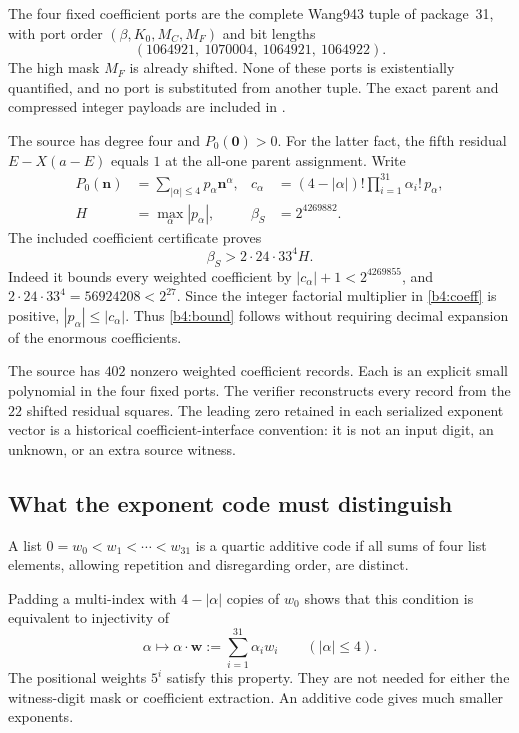 The four fixed coefficient ports are the complete Wang943 tuple of
package~31, with port order $(\beta,K_0,M_C,M_F)$ and bit lengths
\[
 (1064921,\ 1070004,\ 1064921,\ 1064922).
\]
The high mask $M_F$ is already shifted.  None of these ports is
existentially quantified, and no port is substituted from another
tuple.  The exact parent and compressed integer payloads are included
in .

The source has degree four and $P_0(\mathbf0)>0$.  For the latter fact,
the fifth residual $E-X(a-E)$ equals $1$ at the all-one parent
assignment.  Write
\begin{align}
 P_0(\mathbf n)&=\sum_{|\alpha|\le4}p_\alpha\mathbf n^\alpha,
 &
 c_\alpha&=(4-|\alpha|)!\prod_{i=1}^{31}\alpha_i!\,p_\alpha,
 \label{b4:coeff}\\
 H&=\max_\alpha|p_\alpha|,
 &
 \beta_S&=2^{4269882}.
 \label{b4:beta}
\end{align}
The included coefficient certificate proves
\[
 \beta_S>2\cdot24\cdot33^4H.
 \tag{B4.2}\label{b4:bound}
\]
Indeed it bounds every weighted coefficient by
$|c_\alpha|+1<2^{4269855}$, and
$2\cdot24\cdot33^4=56924208<2^{27}$.  Since the integer factorial
multiplier in \eqref{b4:coeff} is positive,
$|p_\alpha|\le|c_\alpha|$.  Thus \eqref{b4:bound} follows without
requiring decimal expansion of the enormous coefficients.

The source has $402$ nonzero weighted coefficient records.  Each is
an explicit small polynomial in the four fixed ports.  The verifier
reconstructs every record from the $22$ shifted residual squares.
The leading zero retained in each serialized exponent vector is a
historical coefficient-interface convention: it is not an input digit,
an unknown, or an extra source witness.

\subsection{What the exponent code must distinguish}
\label{b4:injectivity}

\begin{definition}
A list $0=w_0<w_1<\cdots<w_{31}$ is a quartic additive code if all
sums of four list elements, allowing repetition and disregarding
order, are distinct.
\end{definition}

Padding a multi-index with $4-|\alpha|$ copies of $w_0$ shows that this
condition is equivalent to injectivity of
\[
 \alpha\longmapsto\alpha\cdot\mathbf w
 :=\sum_{i=1}^{31}\alpha_iw_i
 \qquad (|\alpha|\le4).
 \tag{B4.3}\label{b4:injective}
\]
The positional weights $5^i$ satisfy this property.  They are not
needed for either the witness-digit mask or coefficient extraction.
An additive code gives much smaller exponents.

